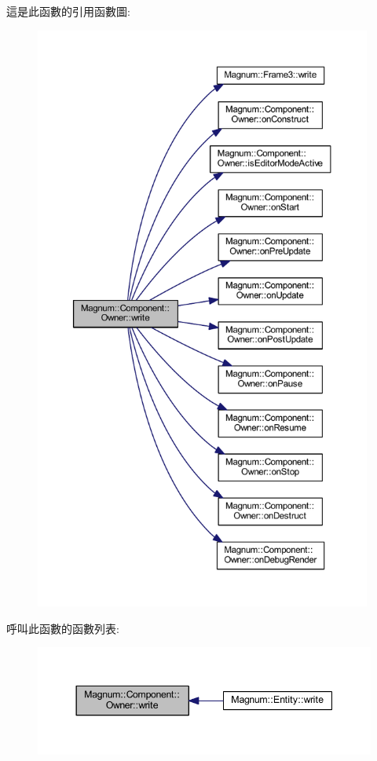 這是此函數的引用函數圖\+:\nopagebreak
\begin{figure}[H]
\begin{center}
\leavevmode
\includegraphics[height=550pt]{class_magnum_1_1_component_1_1_owner_aa0aa90562a79de82adecd5b0451d3bd5_cgraph}
\end{center}
\end{figure}




呼叫此函數的函數列表\+:\nopagebreak
\begin{figure}[H]
\begin{center}
\leavevmode
\includegraphics[width=344pt]{class_magnum_1_1_component_1_1_owner_aa0aa90562a79de82adecd5b0451d3bd5_icgraph}
\end{center}
\end{figure}




